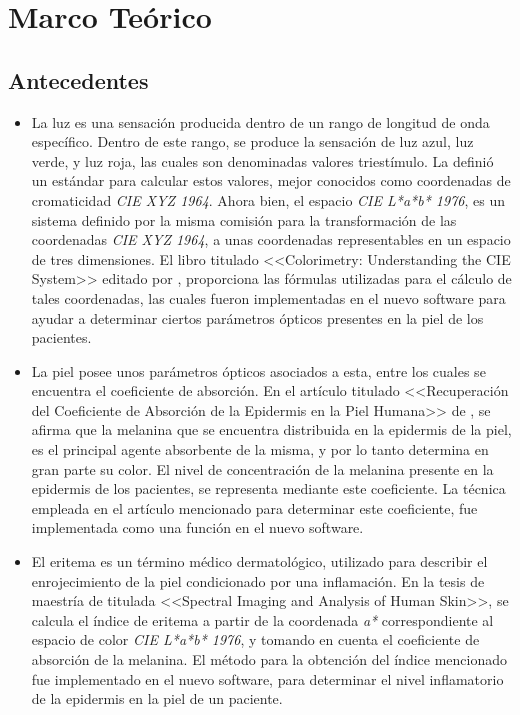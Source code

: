 \chapter{\label{cap:2}Marco Te\'{o}rico}

	\section{Antecedentes}	
		\begin{itemize}
		
			\item
				La luz es una sensaci\'{o}n producida dentro de un rango de longitud de onda espec\'{i}fico. Dentro de este rango, se produce la sensaci\'{o}n de luz azul, luz verde, y luz roja, las cuales son denominadas valores triest\'{i}mulo. La \cite{CIE} defini\'{o} un est\'{a}ndar para calcular estos valores, mejor conocidos como coordenadas de cromaticidad \textit{CIE XYZ 1964}. Ahora bien, el espacio \textit{CIE L*a*b* 1976}, es un sistema definido por la misma comisi\'{o}n para la \mbox{transformaci\'{o}n} de las coordenadas \textit{CIE XYZ 1964}, a unas coordenadas representables en un espacio de tres dimensiones. El libro titulado <<Colorimetry: Understanding the CIE System>> editado por \cite{Schanda}, proporciona las f\'{o}rmulas utilizadas para el c\'{a}lculo de tales coordenadas, las cuales fueron implementadas en el nuevo software para ayudar a determinar ciertos par\'{a}metros \'{o}pticos presentes en la piel de los pacientes.
			
			\item La piel posee unos par\'{a}metros \'{o}pticos asociados a esta, entre los cuales se encuentra el coeficiente de absorci\'{o}n. En el art\'{i}culo titulado <<Recuperaci\'{o}n del Coeficiente de Absorci\'{o}n de la Epidermis en la Piel Humana>> de \cite{Narea}, se afirma que la melanina que se encuentra distribuida en la epidermis de la piel, es el  principal agente absorbente de la misma, y por lo tanto determina en gran parte su color. El nivel de concentraci\'{o}n de la melanina presente en la epidermis de los pacientes, se representa mediante este coeficiente. La t\'{e}cnica empleada en el art\'{i}culo mencionado para determinar este coeficiente, fue implementada como una funci\'{o}n en el nuevo software.
			
			\item El eritema es un t\'{e}rmino m\'{e}dico dermatol\'{o}gico, utilizado para describir el enrojecimiento de la piel condicionado por una inflamaci\'{o}n. En la tesis de maestr\'{i}a de \cite{Bersha} titulada <<Spectral Imaging and Analysis of Human Skin>>, se calcula el \'{i}ndice de eritema a partir de la coordenada \textit{a*} correspondiente al espacio de color \textit{CIE L*a*b* 1976}, y tomando en cuenta el coeficiente de absorci\'{o}n de la melanina. El m\'{e}todo para la obtenci\'{o}n del \'{i}ndice mencionado fue implementado en el nuevo software, para determinar el nivel inflamatorio de la epidermis en la piel de un paciente.
		\end{itemize}

